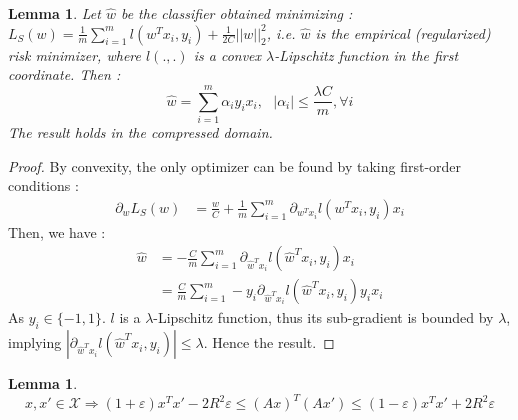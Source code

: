 \documentclass{article}
\newtheorem{lemma}[theorem]{Lemma}
\begin{document}
    \begin{lemma} \label{lemma1}
        Let $\hat{w}$ be the classifier obtained minimizing :
        $L_S(w) = \frac{1}{m} \sum_{i=1}^m l(w^Tx_i, y_i) + \frac{1}{2C}||w||_2^2 $,
        i.e. $\hat{w}$ is the empirical (regularized) risk minimizer,
        where $l(., .)$ is a convex $\lambda$-Lipschitz function in the first coordinate. 
        Then :
        \[\hat{w} = \sum_{i=1}^m \alpha_i y_i x_i , \ \ \
        |\alpha_i|\leq \frac{\lambda C}{m}, \forall i\]
        The result holds in the compressed domain.
    \end{lemma}
    \begin{proof}
         By convexity, the only optimizer can be found
        by taking first-order conditions :
        \begin{align*}
            \partial_w L_S(w) &= 
                    \frac{w}{C} + \frac{1}{m} \sum_{i=1}^m \partial_{w^Tx_i} l(w^T x_i, y_i)x_i
        \end{align*}
        Then, we have :
        \begin{align*}
            \hat{w} &=- \frac{C}{m} \sum_{i=1}^m \partial_{\hat{w}^Tx_i} l(\hat{w}^T x_i, y_i)x_i \\
                    &= \frac{C}{m} \sum_{i=1}^m - y_i\partial_{\hat{w}^Tx_i} l(\hat{w}^T x_i, y_i) y_i x_i
        \end{align*}
        As $y_i\in \{-1, 1\}$. 
        $l$ is a $\lambda$-Lipschitz function, thus its sub-gradient 
        is bounded by $\lambda$, implying $|\partial_{\hat{w}^Tx_i} l(\hat{w}^T x_i, y_i)| \leq \lambda$. 
        Hence the result.
    \end{proof}
    \begin{lemma}\label{lemma2}
        \[ x, x' \in \mathcal{X} 
        \Rightarrow 
        (1+\varepsilon) x^Tx' - 2R^2 \varepsilon 
        \leq (Ax)^T (Ax') 
        \leq (1-\varepsilon) x^Tx' + 2R^2 \varepsilon 
        \]
    \end{lemma}
\end{document}
